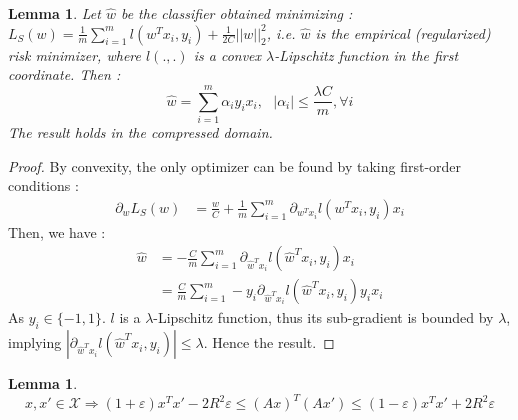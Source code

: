 \documentclass{article}
\newtheorem{lemma}[theorem]{Lemma}
\begin{document}
    \begin{lemma} \label{lemma1}
        Let $\hat{w}$ be the classifier obtained minimizing :
        $L_S(w) = \frac{1}{m} \sum_{i=1}^m l(w^Tx_i, y_i) + \frac{1}{2C}||w||_2^2 $,
        i.e. $\hat{w}$ is the empirical (regularized) risk minimizer,
        where $l(., .)$ is a convex $\lambda$-Lipschitz function in the first coordinate. 
        Then :
        \[\hat{w} = \sum_{i=1}^m \alpha_i y_i x_i , \ \ \
        |\alpha_i|\leq \frac{\lambda C}{m}, \forall i\]
        The result holds in the compressed domain.
    \end{lemma}
    \begin{proof}
         By convexity, the only optimizer can be found
        by taking first-order conditions :
        \begin{align*}
            \partial_w L_S(w) &= 
                    \frac{w}{C} + \frac{1}{m} \sum_{i=1}^m \partial_{w^Tx_i} l(w^T x_i, y_i)x_i
        \end{align*}
        Then, we have :
        \begin{align*}
            \hat{w} &=- \frac{C}{m} \sum_{i=1}^m \partial_{\hat{w}^Tx_i} l(\hat{w}^T x_i, y_i)x_i \\
                    &= \frac{C}{m} \sum_{i=1}^m - y_i\partial_{\hat{w}^Tx_i} l(\hat{w}^T x_i, y_i) y_i x_i
        \end{align*}
        As $y_i\in \{-1, 1\}$. 
        $l$ is a $\lambda$-Lipschitz function, thus its sub-gradient 
        is bounded by $\lambda$, implying $|\partial_{\hat{w}^Tx_i} l(\hat{w}^T x_i, y_i)| \leq \lambda$. 
        Hence the result.
    \end{proof}
    \begin{lemma}\label{lemma2}
        \[ x, x' \in \mathcal{X} 
        \Rightarrow 
        (1+\varepsilon) x^Tx' - 2R^2 \varepsilon 
        \leq (Ax)^T (Ax') 
        \leq (1-\varepsilon) x^Tx' + 2R^2 \varepsilon 
        \]
    \end{lemma}
\end{document}
